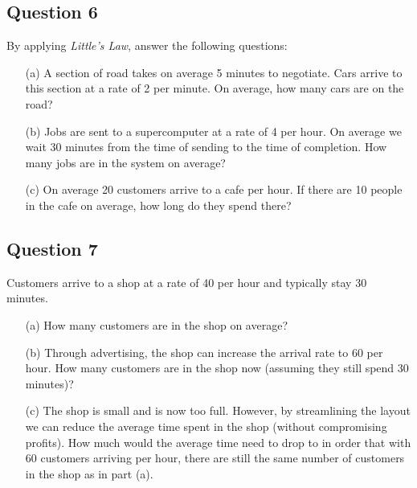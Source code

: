 

\subsection*{Question 6}
By applying \emph{Little's Law}, answer the following questions:\\[-0.2cm]
\begin{itemize}
\item[(a)] A section of road takes on average 5 minutes to negotiate. Cars arrive to this section at a rate of 2 per minute. On average, how many cars are on the road?   \item[(b)] Jobs are sent to a supercomputer at a rate of 4 per hour. On average we wait 30 minutes from the time of sending to the time of completion. How many jobs are in the system on average?  \item[(c)] On average 20 customers arrive to a cafe per hour. If there are 10 people in the cafe on average, how long do they spend there?
\end{itemize}




\subsection*{Question 7}
Customers arrive to a shop at a rate of 40 per hour and typically stay 30 minutes. \\[-0.2cm]
\begin{itemize}
\item[(a)] How many customers are in the shop on average?  \item[(b)] Through advertising, the shop can increase the arrival rate to 60 per hour. How many customers are in the shop now (assuming they still spend 30 minutes)?  \item[(c)] The shop is small and is now too full. However, by streamlining the layout we can reduce the average time spent in the shop (without compromising profits). How much would the average time need to drop to in order that with 60 customers arriving per hour, there are still the same number of customers in the shop as in part (a).


\end{itemize}







 
